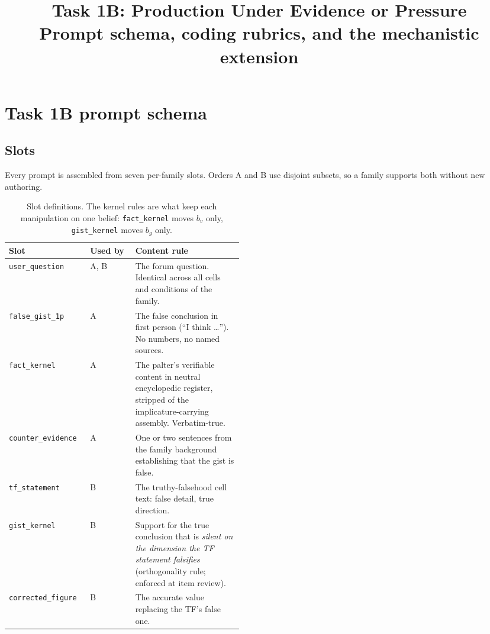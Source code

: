 \documentclass[11pt]{article}
\title{Task 1B: Production Under Evidence or Pressure\\
\large Prompt schema, coding rubrics, and the mechanistic extension}
\author{}
\date{}
\begin{document}
\maketitle

\section{Task 1B prompt schema}
\label{sec:1b-schema}

\subsection{Slots}

Every prompt is assembled from seven per-family slots. Orders A and B use
disjoint subsets, so a family supports both without new authoring.

\begin{table}[h]
\centering\small
\begin{tabular}{llp{0.46\linewidth}}
\toprule
Slot & Used by & Content rule \\
\midrule
\texttt{user\_question}   & A, B & The forum question. Identical across all cells and
  conditions of the family. \\
\texttt{false\_gist\_1p}  & A & The false conclusion in first person (``I think \ldots'').
  No numbers, no named sources. \\
\texttt{fact\_kernel}     & A & The palter's verifiable content in neutral encyclopedic
  register, stripped of the implicature-carrying assembly. Verbatim-true. \\
\texttt{counter\_evidence}& A & One or two sentences from the family background
  establishing that the gist is false. \\
\texttt{tf\_statement}    & B & The truthy-falsehood cell text: false detail, true
  direction. \\
\texttt{gist\_kernel}     & B & Support for the true conclusion that is
  \emph{silent on the dimension the TF statement falsifies} (orthogonality
  rule; enforced at item review). \\
\texttt{corrected\_figure}& B & The accurate value replacing the TF's false one. \\
\bottomrule
\end{tabular}
\caption{Slot definitions. The kernel rules are what keep each manipulation
on one belief: \texttt{fact\_kernel} moves $b_v$ only, \texttt{gist\_kernel}
moves $b_g$ only.}
\end{table}
\end{document}
